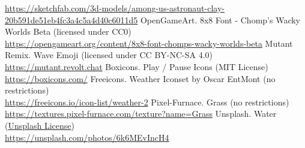\documentclass{article}
\begin{document}
\begin{thebibliography}{9}
        \url{https://sketchfab.com/3d-models/among-us-astronaut-clay-20b591de51eb4fc3a4c5a4d40c6011d5}
        OpenGameArt. 8x8 Font - Chomp's Wacky Worlds Beta (licensed under CC0) \\
        \url{https://opengameart.org/content/8x8-font-chomps-wacky-worlds-beta}
        Mutant Remix. Wave Emoji (licensed under CC BY-NC-SA 4.0) \\
        \url{https://mutant.revolt.chat}
        Boxicons. Play / Pause Icons (MIT License) \\
        \url{https://boxicons.com/}
        Freeicons. Weather Iconset by Oscar EntMont (no restrictions) \\
        \url{https://freeicons.io/icon-list/weather-2}
        Pixel-Furnace. Grass (no restrictions) \\
        \url{https://textures.pixel-furnace.com/texture?name=Grass}
        Unsplash. Water (\href{https://unsplash.com/license}{Unsplash License}) \\
        \url{https://unsplash.com/photos/6k6MEvIncH4}
    \end{thebibliography}
    
    \newpage
\end{document}
